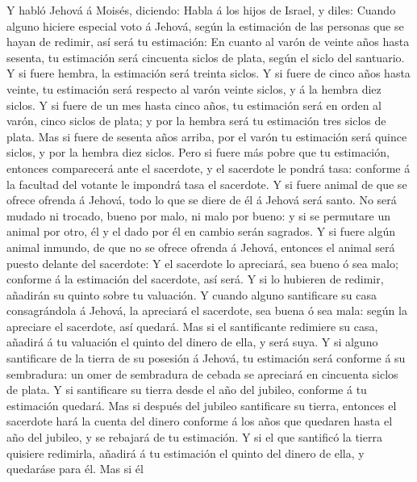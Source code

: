  Y habló Jehová á Moisés, diciendo:  Habla á los
hijos de Israel, y diles: Cuando alguno hiciere especial voto á Jehová,
según la estimación de las personas que se hayan de redimir, así será tu
estimación:  En cuanto al varón de veinte años hasta
sesenta, tu estimación será cincuenta siclos de plata, según el siclo
del santuario.  Y si fuere hembra, la estimación será
treinta siclos.  Y si fuere de cinco años hasta veinte, tu
estimación será respecto al varón veinte siclos, y á la hembra diez
siclos.  Y si fuere de un mes hasta cinco años, tu
estimación será en orden al varón, cinco siclos de plata; y por la
hembra será tu estimación tres siclos de plata.  Mas si
fuere de sesenta años arriba, por el varón tu estimación será quince
siclos, y por la hembra diez siclos.  Pero si fuere más
pobre que tu estimación, entonces comparecerá ante el sacerdote, y el
sacerdote le pondrá tasa: conforme á la facultad del votante le impondrá
tasa el sacerdote.  Y si fuere animal de que se ofrece
ofrenda á Jehová, todo lo que se diere de él á Jehová será santo.
 No será mudado ni trocado, bueno por malo, ni malo por
bueno: y si se permutare un animal por otro, él y el dado por él en
cambio serán sagrados.  Y si fuere algún animal inmundo, de
que no se ofrece ofrenda á Jehová, entonces el animal será puesto
delante del sacerdote:  Y el sacerdote lo apreciará, sea
bueno ó sea malo; conforme á la estimación del sacerdote, así será.
 Y si lo hubieren de redimir, añadirán su quinto sobre tu
valuación.  Y cuando alguno santificare su casa
consagrándola á Jehová, la apreciará el sacerdote, sea buena ó sea mala:
según la apreciare el sacerdote, así quedará.  Mas si el
santificante redimiere su casa, añadirá á tu valuación el quinto del
dinero de ella, y será suya.  Y si alguno santificare de la
tierra de su posesión á Jehová, tu estimación será conforme á su
sembradura: un omer de sembradura de cebada se apreciará en cincuenta
siclos de plata.  Y si santificare su tierra desde el año
del jubileo, conforme á tu estimación quedará.  Mas si
después del jubileo santificare su tierra, entonces el sacerdote hará la
cuenta del dinero conforme á los años que quedaren hasta el año del
jubileo, y se rebajará de tu estimación.  Y si el que
santificó la tierra quisiere redimirla, añadirá á tu estimación el
quinto del dinero de ella, y quedaráse para él.  Mas si él
